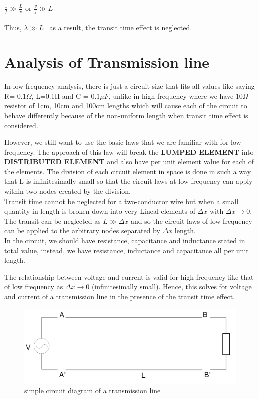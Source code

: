 $ \frac{1}{f} \gg \frac{L}{v} $ or $ \frac{v}{f} \gg L $ \\\\
Thus, $ \lambda \gg L $ \ as a result, the transit time effect is neglected.

\section{Analysis of Transmission line}
In low-frequency analysis, there is just a circuit size that fits all values like saying R= $ 0.1\Omega $, L=0.1H and C = $ 0.1\mu F $, unlike in high frequency where we have $ 10\Omega $ resistor of 1cm, 10cm and 100cm lengths which will cause each of the circuit to behave differently because of the non-uniform length when transit time effect is considered.

However, we still want to use the basic laws that we are familiar with for low frequency. The approach of this law will break the\textbf{ LUMPED ELEMENT} into \textbf{DISTRIBUTED ELEMENT} and also have per unit element value for each of the elements. The division of each circuit element in space is done in such a way that L is infinitesimally small so that the circuit laws at low frequency can apply within two nodes created by the division.\\

Transit time cannot be neglected for a two-conductor wire but when a small quantity in length is broken down into very Lineal elements of $ \Delta x $ with  $  \Delta x \rightarrow 0 $. The transit can be neglected as $ L \gg \Delta x $ and so the circuit laws of low frequency can be applied to the arbitrary nodes separated by $ \Delta x $ length. \\
In the circuit, we should have resistance, capacitance and inductance stated in total value, instead, we have resistance, inductance and capacitance all per unit length.

The relationship between voltage and current is valid for high frequency like that of low frequency as $ \Delta x  \rightarrow 0$ (infinitesimally small). Hence, this solves for voltage and current of a transmission line in the presence of the transit time effect.\\
\begin{figure}[h]
\centering
\includegraphics[width=1\linewidth]{./graphics/second}
\caption{simple circuit diagram of a transmission line}
\end{figure}	

